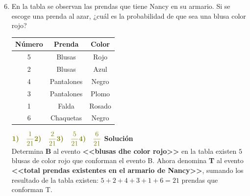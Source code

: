 \documentclass[11pt, a4paper]{article} %
\theoremstyle{dotlessP}
\theoremstyle{dotlessS}
\begin{document}
\begin{enumerate}[label=\color{dg}\theenumi.]
 \setcounter{enumi}{5}
  \normalsize
   \item {\color{db}En la tabla se observan las 			prendas que tiene Nancy en su armario. Si se 			escoge 	una prenda al azar, ¿cuál es la 				probabilidad de que 	sea una blusa color rojo?
        }
        
	\begin{table}[htbp]
		\centering
		\label{my-label}
	\begin{tabular}{|c|c|c|}
		\hline
		\textbf{Número} & \textbf{Prenda} & 					\textbf{Color} \\ \hline
		5               & Blusas          & Rojo         		  \\ \hline
		2               & Blusas          & Azul          		 \\ \hline
		4               & Pantalones      & Negro          \\ 		\hline
		3               & Pantalones      & Plomo          \\ 		\hline
		1               & Falda           & Rosado         \\ 		\hline
		6               & Chaquetas       & Negro          \\ 		\hline
	\end{tabular}
	\end{table}
    \(
     {\color{dh} \textbf{1)} \quad \dfrac{1}{21}} \vspace{1\baselineskip} \\ 	
     {\color{dh} \textbf{2)} \quad \dfrac{2}{21}} \vspace{1\baselineskip} \\ 	
     {\color{dh} \textbf{3)} \quad \dfrac{5}{21}} \vspace{1\baselineskip} \\ 	
     {\color{dh} \textbf{4)} \quad \dfrac{6}{21}}   \vspace{1\baselineskip} \\ 	
      \)
      \textbf{Solución} \\
    Determina \textbf{B} al evento \textbf{<<blusas dhe 			color rojo>>} en la tabla existen \(5\) blusas de color 	rojo que conforman el evento B. Ahora denomina \textbf{T} 		al evento \textbf{<<total prendas existentes en el 		armario de Nancy>>}, sumando los resultado de la tabla 		existen: \(5 + 2 + 4 + 3 + 1 + 6 = 21\) prendas que 		conforman T.

\end{enumerate}
\end{document}
